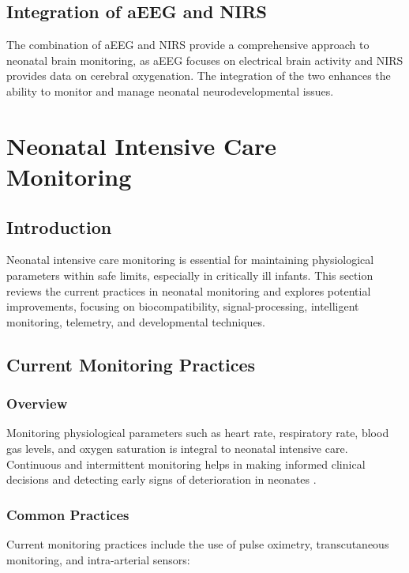\documentclass[12pt,journal,compsoc]{IEEEtran}
\begin{document}
\subsection{Integration of aEEG and NIRS}
The combination of aEEG and NIRS provide a comprehensive approach to neonatal brain monitoring, as aEEG focuses on electrical brain activity and NIRS provides data on cerebral oxygenation. The integration of the two enhances the ability to monitor and manage neonatal neurodevelopmental issues. 

\section{Neonatal Intensive Care Monitoring}

\subsection{Introduction}
Neonatal intensive care monitoring is essential for maintaining physiological parameters within safe limits, especially in critically ill infants. This section reviews the current practices in neonatal monitoring and explores potential improvements, focusing on biocompatibility, signal-processing, intelligent monitoring, telemetry, and developmental techniques.

\subsection{Current Monitoring Practices}

\subsubsection{Overview}
Monitoring physiological parameters such as heart rate, respiratory rate, blood gas levels, and oxygen saturation is integral to neonatal intensive care. Continuous and intermittent monitoring helps in making informed clinical decisions and detecting early signs of deterioration in neonates \cite{IEEEhowto:nicklin}.

\subsubsection{Common Practices}
Current monitoring practices include the use of pulse oximetry, transcutaneous monitoring, and intra-arterial sensors:
\end{document}
